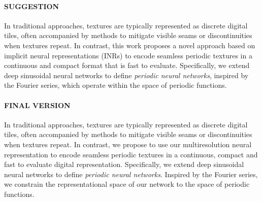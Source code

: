 \paragraph{SUGGESTION}
In traditional approaches, textures are typically represented as discrete digital tiles, often accompanied by methods to mitigate visible seams or discontinuities when textures repeat. In contrast, this work proposes a novel approach based on implicit neural representations (INRs) to encode seamless periodic textures in a continuous and compact format that is fast to evaluate. Specifically, we extend deep sinusoidal neural networks to define \textit{periodic neural networks}, inspired by the Fourier series, which operate within the space of periodic functions.

\paragraph{FINAL VERSION}
In traditional approaches, textures are typically represented as discrete digital tiles, often accompanied by methods to mitigate visible seams or discontinuities when textures repeat. In contrast, we propose to use our multiresolution neural representation to encode seamless periodic textures in a continuous, compact and fast to evaluate digital representation. Specifically, we extend deep sinusoidal neural networks to define \textit{periodic neural networks}. Inspired by the Fourier series, we constrain the representational space of our network to the space of periodic functions.